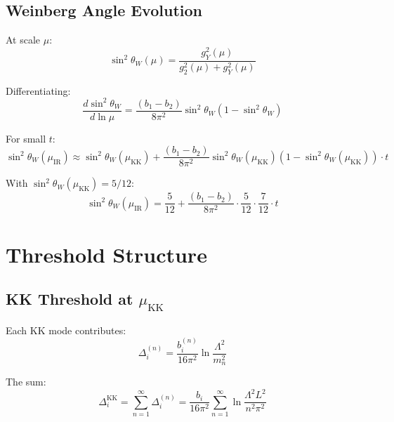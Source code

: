 \documentclass[11pt,a4paper]{article}
\begin{document}
\subsection{Weinberg Angle Evolution}
\label{subsec:weinberg-evolution}

At scale $\mu$:
\begin{equation}
\label{eq:weinberg-def}
\sin^2\theta_W(\mu) = \frac{g_Y^2(\mu)}{g_2^2(\mu) + g_Y^2(\mu)}
\end{equation}

Differentiating:
\begin{equation}
\label{eq:weinberg-rg}
\frac{d\sin^2\theta_W}{d\ln\mu} = \frac{(b_1 - b_2)}{8\pi^2}\sin^2\theta_W(1 - \sin^2\theta_W)
\end{equation}

For small $t$:
\begin{equation}
\label{eq:weinberg-linear}
\sin^2\theta_W(\mu_{\text{IR}}) \approx \sin^2\theta_W(\mu_{\text{KK}}) + \frac{(b_1 - b_2)}{8\pi^2}\sin^2\theta_W(\mu_{\text{KK}})(1 - \sin^2\theta_W(\mu_{\text{KK}})) \cdot t
\end{equation}

With $\sin^2\theta_W(\mu_{\text{KK}}) = 5/12$:
\begin{equation}
\label{eq:weinberg-numeric-free}
\sin^2\theta_W(\mu_{\text{IR}}) = \frac{5}{12} + \frac{(b_1 - b_2)}{8\pi^2} \cdot \frac{5}{12} \cdot \frac{7}{12} \cdot t
\end{equation}

\section{Threshold Structure}
\label{sec:thresholds}

\subsection{KK Threshold at $\mu_{\text{KK}}$}
\label{subsec:kk-threshold}

Each KK mode contributes:
\begin{equation}
\label{eq:kk-threshold-contrib}
\Delta_i^{(n)} = \frac{b_i^{(n)}}{16\pi^2}\ln\frac{\Lambda^2}{m_n^2}
\end{equation}

The sum:
\begin{equation}
\label{eq:kk-sum}
\Delta_i^{\text{KK}} = \sum_{n=1}^{\infty}\Delta_i^{(n)} = \frac{b_i}{16\pi^2}\sum_{n=1}^{\infty}\ln\frac{\Lambda^2 L^2}{n^2\pi^2}
\end{equation}
\end{document}
